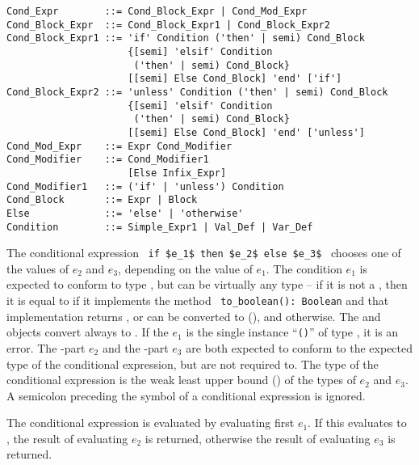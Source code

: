 \syntax\begin{lstlisting}
Cond_Expr        ::= Cond_Block_Expr | Cond_Mod_Expr
Cond_Block_Expr  ::= Cond_Block_Expr1 | Cond_Block_Expr2
Cond_Block_Expr1 ::= 'if' Condition ('then' | semi) Cond_Block 
                     {[semi] 'elsif' Condition 
                      ('then' | semi) Cond_Block}
                     [[semi] Else Cond_Block] 'end' ['if']
Cond_Block_Expr2 ::= 'unless' Condition ('then' | semi) Cond_Block 
                     {[semi] 'elsif' Condition 
                      ('then' | semi) Cond_Block}
                     [[semi] Else Cond_Block] 'end' ['unless']
Cond_Mod_Expr    ::= Expr Cond_Modifier
Cond_Modifier    ::= Cond_Modifier1
                     [Else Infix_Expr]
Cond_Modifier1   ::= ('if' | 'unless') Condition 
Cond_Block       ::= Expr | Block
Else             ::= 'else' | 'otherwise'
Condition        ::= Simple_Expr1 | Val_Def | Var_Def
\end{lstlisting}

The conditional expression ~\lstinline!if $e_1$ then $e_2$ else $e_3$!~ chooses one of the values of $e_2$ and $e_3$, depending on the value of $e_1$. The condition $e_1$ is expected to conform to type , but can be virtually any type -- if it is not a , then it is equal to  if it implements the method ~\lstinline!to_boolean(): Boolean! and that implementation returns , or can be converted to  (), and  otherwise. The  and  objects convert always to . If the $e_1$ is the single instance ``\lstinline!()!'' of type , it is an error. The -part $e_2$ and the -part $e_3$ are both expected to conform to the expected type of the conditional expression, but are not required to. The type of the conditional expression is the weak least upper bound () of the types of $e_2$ and $e_3$. A semicolon preceding the  symbol of a conditional expression is ignored. 

The conditional expression is evaluated by evaluating first $e_1$. If this evaluates to , the result of evaluating $e_2$ is returned, otherwise the result of evaluating $e_3$ is returned. 

